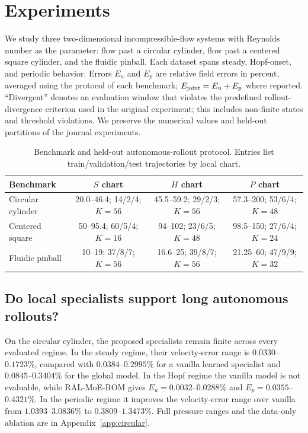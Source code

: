 \section{Experiments}
\label{sec:experiments}

We study three two-dimensional incompressible-flow systems with Reynolds number as the parameter: flow past a circular cylinder, flow past a centered square cylinder, and the fluidic pinball. Each dataset spans steady, Hopf-onset, and periodic behavior. Errors $E_u$ and $E_p$ are relative field errors in percent, averaged using the protocol of each benchmark; $E_{\rm joint}=E_u+E_p$ where reported. ``Divergent'' denotes an evaluation window that violates the predefined rollout-divergence criterion used in the original experiment; this includes non-finite states and threshold violations. We preserve the numerical values and held-out partitions of the journal experiments.

\begin{table}[t]
\centering
\caption{Benchmark and held-out autonomous-rollout protocol. Entries list train/validation/test trajectories by local chart.}
\label{tab:benchmark_summary}
\small
\setlength{\tabcolsep}{3.2pt}
\begin{tabular}{lccc}
\toprule
Benchmark & $S$ chart & $H$ chart & $P$ chart \\
\midrule
Circular cylinder
 & 20.0--46.4; 14/2/4; $K{=}56$
 & 45.5--59.2; 29/2/3; $K{=}56$
 & 57.3--200; 53/6/4; $K{=}48$ \\
Centered square
 & 50--95.4; 60/5/4; $K{=}16$
 & 94--102; 23/6/5; $K{=}48$
 & 98.5--150; 27/6/4; $K{=}24$ \\
Fluidic pinball
 & 10--19; 37/8/7; $K{=}56$
 & 16.6--25; 39/8/7; $K{=}56$
 & 21.25--60; 47/9/9; $K{=}32$ \\
\bottomrule
\end{tabular}
\end{table}

\subsection{Do local specialists support long autonomous rollouts?}

On the circular cylinder, the proposed specialists remain finite across every evaluated regime. In the steady regime, their velocity-error range is $0.0330$--$0.1723\%$, compared with $0.0384$--$0.2995\%$ for a vanilla learned specialist and $0.0845$--$0.3404\%$ for the global model. In the Hopf regime the vanilla model is not evaluable, while RAL-MoE-ROM gives $E_u=0.0032$--$0.0288\%$ and $E_p=0.0355$--$0.4321\%$. In the periodic regime it improves the velocity-error range over vanilla from $1.0393$--$3.0836\%$ to $0.3809$--$1.3473\%$. Full pressure ranges and the data-only ablation are in Appendix~\ref{app:circular}.

